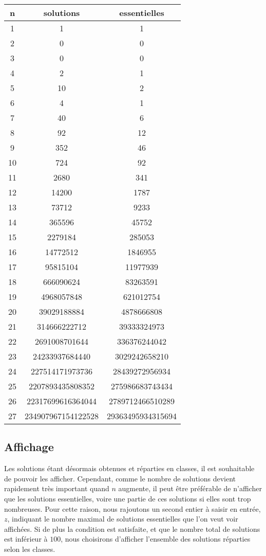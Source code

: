 \documentclass[a4paper]{article}
\begin{document}
\begin{tabular}{|c|c|c|}
  \hline
  n & solutions & essentielles \\
  \hline
  1 & 1 & 1 \\
  2 & 0 & 0 \\
  3 & 0 & 0 \\
  4 & 2 & 1 \\
  5 & 10 & 2 \\
  6 & 4 & 1 \\
  7 & 40 & 6 \\
  8 & 92 & 12 \\
  9 & 352 & 46 \\
  10 & 724 & 92 \\
  11 & 2680 & 341 \\
  12 & 14200 & 1787 \\
  13 & 73712 & 9233 \\
  14 & 365596 & 45752 \\
  15 & 2279184 & 285053 \\
  16 & 14772512 & 1846955 \\
  17 & 95815104 & 11977939 \\
  18 & 666090624 & 83263591 \\
  19 & 4968057848 & 621012754 \\
  20 & 39029188884 & 4878666808 \\
  21 & 314666222712 & 39333324973 \\
  22 & 2691008701644 & 336376244042 \\
  23 & 24233937684440 & 3029242658210 \\
  24 & 227514171973736 & 28439272956934 \\
  25 & 2207893435808352 & 275986683743434 \\
  26 & 22317699616364044 & 2789712466510289 \\
  27 & 234907967154122528 & 29363495934315694 \\
  \hline
\end{tabular}


\subsection{Affichage}
Les solutions étant désormais obtenues et réparties en classes, il est souhaitable de pouvoir les afficher. Cependant, comme le nombre de solutions devient rapidement très important quand $n$ augmente, il peut être préférable de n'afficher que les solutions essentielles, voire une partie de ces solutions si elles sont trop nombreuses. Pour cette raison, nous rajoutons un second entier à saisir en entrée, $z$, indiquant le nombre maximal de solutions essentielles que l'on veut voir affichées. Si de plus la condition est satisfaite, et que le nombre total de solutions est inférieur à $100$, nous choisirons d'afficher l'ensemble des solutions réparties selon les classes.
\end{document}
